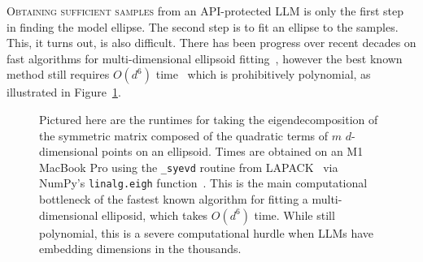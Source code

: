 \documentclass{article}
\begin{document}
\lettrine{O}{btaining sufficient samples} from an API-protected LLM is only the first step in finding the model ellipse. 
The second step is to fit an ellipse to the samples.
This, it turns out, is also difficult. 
There has been progress over recent decades on fast algorithms for multi-dimensional ellipsoid fitting~\citep{Calafiore2002ApproximationON, Ying2012AFA}, however the best known method still requires \(O(d^6)\) time~\citep{Lin2016FastME} which is prohibitively polynomial, as illustrated in Figure~\ref{fig:eigh}.

\begin{figure}
  \centering
  \small
  \caption{
    Pictured here are the runtimes for taking the eigendecomposition of the symmetric matrix 
    composed of the quadratic terms of \(m\) \(d\)-dimensional points on an ellipsoid.
    Times are obtained on an M1 MacBook Pro
    using the \texttt{\_syevd} routine from LAPACK~\citep{laug} 
    via NumPy's \texttt{linalg.eigh} function~\citep{harris2020array}.
    This is the main computational bottleneck of the fastest known algorithm 
    for fitting a multi-dimensional elliposid, which takes \(O(d^6)\) time. 
    While still polynomial, this is a severe computational hurdle
    when LLMs have embedding dimensions in the thousands.
  }
  \label{fig:eigh}
\end{figure}



\end{document}
